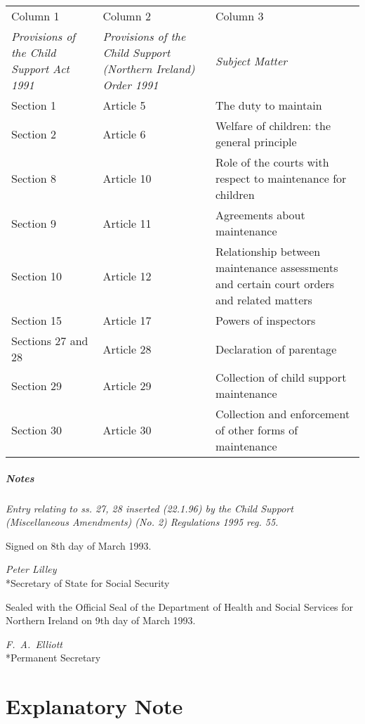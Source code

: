 \documentclass[a4paper]{article}
\newcommand\amendment[1]{\subsubsection*{Notes}{\itshape\frenchspacing\footnotesize #1 \par}}
\begin{document}
\noindent
\begin{tabulary}{\linewidth}{JJJ}
\hline
Column 1 & Column 2 & Column 3\\
\itshape Provisions of the Child Support Act 1991 & \itshape Provisions of the Child Support (Northern Ireland) Order 1991 & \itshape Subject Matter\\
\hline
Section 1&Article 5&The duty to maintain\\
Section 2&Article 6&Welfare of children: the general principle\\
Section 8&Article 10&Role of the courts with respect to maintenance for children\\
Section 9&Article 11&Agreements about maintenance\\
Section 10&Article 12&Relationship between maintenance assessments and certain court orders and related matters\\
Section 15&Article 17&Powers of inspectors\\
Sections 27 and 28 & Article 28 & Declaration of parentage\\ %
Section 29&Article 29&Collection of child support maintenance\\
Section 30&Article 30&Collection and enforcement of other forms of maintenance\\
\hline
\end{tabulary}

\amendment{
Entry relating to ss. 27, 28 inserted (22.1.96) by the Child Support (Miscellaneous Amendments) (No. 2) Regulations 1995 reg. 55.
}

\bigskip

Signed on 8th day of March 1993.

{\raggedleft
\emph{Peter Lilley}\\*Secretary of State for Social Security

}

\bigskip

Sealed with the Official Seal of the Department of Health and Social Services for Northern Ireland on 9th day of March 1993.


{\raggedleft
\emph{F.\ A.\ Elliott}\\*Permanent Secretary

}

\part{Explanatory Note}
\end{document}
